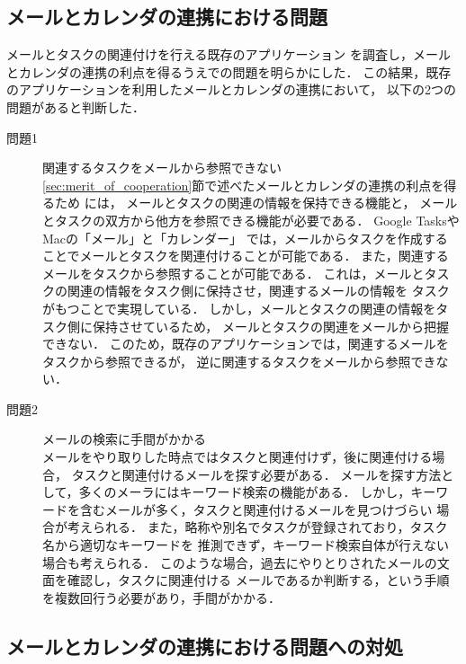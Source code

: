 \documentclass[submit,techreq,noauthor,dvipdfmx]{ipsj}
\begin{document}
\subsection{メールとカレンダの連携における問題}\label{sec:problem}
メールとタスクの関連付けを行える既存のアプリケーション
\cite{GoogleTasks}\cite{Mac_app}
を調査し，メールとカレンダの連携の利点を得るうえでの問題を明らかにした．
この結果，既存のアプリケーションを利用したメールとカレンダの連携において，
以下の2つの問題があると判断した．
\begin{description}
  \item[問題1] 関連するタスクをメールから参照できない\\
    \ref{sec:merit_of_cooperation}節で述べたメールとカレンダの連携の利点を得るため
    には，
    メールとタスクの関連の情報を保持できる機能と，
    メールとタスクの双方から他方を参照できる機能が必要である．
    Google Tasks\cite{GoogleTasks}やMacの「メール」と「カレンダー」\cite{Mac_app}
    では，メールからタスクを作成することでメールとタスクを関連付けることが可能である．
    また，関連するメールをタスクから参照することが可能である．
    これは，メールとタスクの関連の情報をタスク側に保持させ，関連するメールの情報を
    タスクがもつことで実現している．
    しかし，メールとタスクの関連の情報をタスク側に保持させているため，
    メールとタスクの関連をメールから把握できない．
    このため，既存のアプリケーションでは，関連するメールをタスクから参照できるが，
    逆に関連するタスクをメールから参照できない．

  \item[問題2] メールの検索に手間がかかる\\
    メールをやり取りした時点ではタスクと関連付けず，後に関連付ける場合，
    タスクと関連付けるメールを探す必要がある．
    メールを探す方法として，多くのメーラにはキーワード検索の機能がある．
    しかし，キーワードを含むメールが多く，タスクと関連付けるメールを見つけづらい
    場合が考えられる．
    また，略称や別名でタスクが登録されており，タスク名から適切なキーワードを
    推測できず，キーワード検索自体が行えない場合も考えられる．
    このような場合，過去にやりとりされたメールの文面を確認し，タスクに関連付ける
    メールであるか判断する，という手順を複数回行う必要があり，手間がかかる．

\end{description}



\subsection{メールとカレンダの連携における問題への対処}\label{sec:solution}
\end{document}
